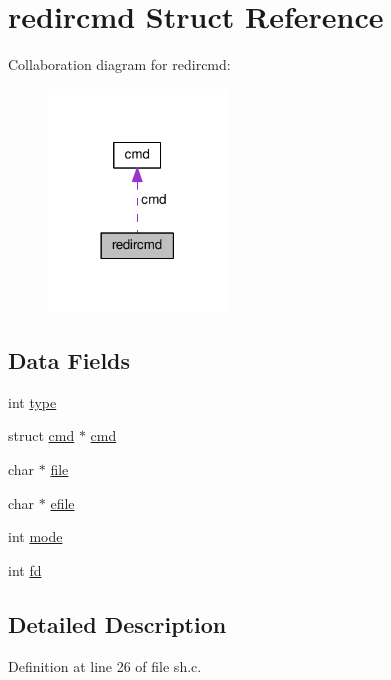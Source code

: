\hypertarget{structredircmd}{\section{redircmd Struct Reference}
\label{structredircmd}
}


Collaboration diagram for redircmd\-:
\nopagebreak
\begin{figure}[H]
\begin{center}
\leavevmode
\includegraphics[width=134pt]{structredircmd__coll__graph}
\end{center}
\end{figure}
\subsection*{Data Fields}
\begin{DoxyCompactItemize}
\item 
int \hyperlink{structredircmd_ac765329451135abec74c45e1897abf26}{type}
\item 
struct \hyperlink{structcmd}{cmd} $\ast$ \hyperlink{structredircmd_ae827072868c061a3985f9032a4522673}{cmd}
\item 
char $\ast$ \hyperlink{structredircmd_adf16cd437526a5c5e0e0af87745acbb8}{file}
\item 
char $\ast$ \hyperlink{structredircmd_ab5755209db30db6cbfdec21ca15015db}{efile}
\item 
int \hyperlink{structredircmd_a1ea5d0cb93f22f7d0fdf804bd68c3326}{mode}
\item 
int \hyperlink{structredircmd_a6f8059414f0228f0256115e024eeed4b}{fd}
\end{DoxyCompactItemize}


\subsection{Detailed Description}


Definition at line 26 of file sh.\-c.



